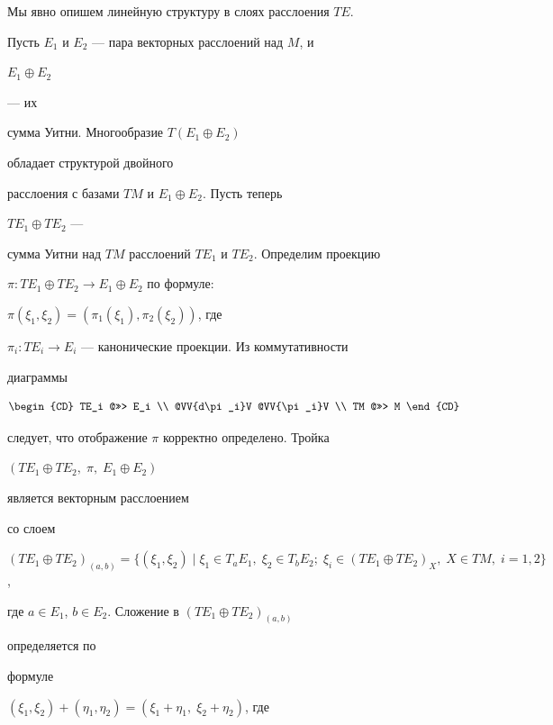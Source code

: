 


Мы явно опишем линейную структуру в слоях расслоения $TE$. 


 


Пусть $E_1$ и $E_2$ --- пара векторных расслоений над $M$, и 


$E_1\oplus E_2$ 


--- их 


сумма Уитни. Многообразие $T(E_1\oplus E_2)$ 


обладает структурой двойного  


расслоения с базами $TM$ и $E_1\oplus E_2$. Пусть теперь 


$TE_1\oplus TE_2$ --- 


сумма Уитни над $TM$ расслоений $TE_1$ и $TE_2$. Определим проекцию 


$\pi:TE_1\oplus TE_2\to E_1\oplus E_2$ по формуле: 


$\pi(\xi_1,\xi_2)=(\pi_1(\xi_1),\pi_2(\xi_2))$, где 


$\pi_i:TE_i\to E_i$ --- канонические проекции. Из коммутативности 


диаграммы 


$$ 


\begin{CD} 


TE_i @>>> E_i \\ 


@VV{d\pi_i}V @VV{\pi_i}V \\ 


TM @>>> M 


\end{CD} 


$$ 


следует, что отображение $\pi$ корректно определено. Тройка 


$(TE_1\oplus TE_2,\;\pi,\;E_1\oplus E_2)$ 


является векторным расслоением 


со слоем 


$(TE_1\oplus TE_2)_{(a,b)}=\{(\xi_1,\xi_2)\mid\xi_1\in T_a E_1,\; 


\xi_2\in T_b E_2;\;\xi_i\in(TE_1\oplus TE_2)_X,\;X\in TM,\; 


i=1,2\}$, 


где $a\in E_1$, $b\in E_2$. Сложение в $(TE_1\oplus TE_2)_{(a,b)}$ 


определяется по 


формуле 


$(\xi_1,\xi_2)+(\eta_1,\eta_2)=(\xi_1+\eta_1,\;\xi_2+\eta_2)$, где 


